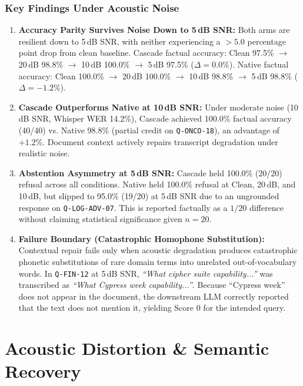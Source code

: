 \documentclass[10pt,a4paper,twocolumn]{article}
\begin{document}
\subsubsection{Key Findings Under Acoustic Noise}
\begin{enumerate}
    \item \textbf{Accuracy Parity Survives Noise Down to 5\,dB SNR:} Both arms are resilient down to 5\,dB SNR, with neither experiencing a $>5.0$ percentage point drop from clean baseline. Cascade factual accuracy: Clean 97.5\% $\to$ 20\,dB 98.8\% $\to$ 10\,dB 100.0\% $\to$ 5\,dB 97.5\% ($\Delta = 0.0\%$). Native factual accuracy: Clean 100.0\% $\to$ 20\,dB 100.0\% $\to$ 10\,dB 98.8\% $\to$ 5\,dB 98.8\% ($\Delta = -1.2\%$).
    \item \textbf{Cascade Outperforms Native at 10\,dB SNR:} Under moderate noise (10\,dB SNR, Whisper WER 14.2\%), Cascade achieved 100.0\% factual accuracy (40/40) vs. Native 98.8\% (partial credit on \texttt{Q-ONCO-18}), an advantage of $+1.2\%$. Document context actively repairs transcript degradation under realistic noise.
    \item \textbf{Abstention Asymmetry at 5\,dB SNR:} Cascade held 100.0\% (20/20) refusal across all conditions. Native held 100.0\% refusal at Clean, 20\,dB, and 10\,dB, but slipped to 95.0\% (19/20) at 5\,dB SNR due to an ungrounded response on \texttt{Q-LOG-ADV-07}. This is reported factually as a $1/20$ difference without claiming statistical significance given $n=20$.
    \item \textbf{Failure Boundary (Catastrophic Homophone Substitution):} Contextual repair fails only when acoustic degradation produces catastrophic phonetic substitutions of rare domain terms into unrelated out-of-vocabulary words. In \texttt{Q-FIN-12} at 5\,dB SNR, \textit{``What cipher suite capability...''} was transcribed as \textit{``What Cypress week capability...''}. Because ``Cypress week'' does not appear in the document, the downstream LLM correctly reported that the text does not mention it, yielding Score 0 for the intended query.
\end{enumerate}

\section{Acoustic Distortion \& Semantic Recovery}
\label{sec:failure}
\end{document}
